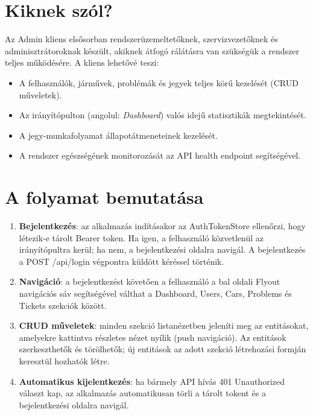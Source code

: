 \documentclass[colorlinks]{thesis-kando}
\begin{document}
\section{Kiknek szól?}

Az Admin kliens elsősorban rendszerüzemeltetőknek, szervizvezetőknek és adminisztrátoroknak készült, akiknek átfogó rálátásra van szükségük a rendszer teljes működésére. A kliens lehetővé teszi:

\begin{itemize}
\item A felhasználók, járművek, problémák és jegyek teljes körű kezelését (CRUD műveletek).
\item Az irányítópulton (angolul: \emph{Dashboard}) valós idejű statisztikák megtekintését.
\item A jegy-munkafolyamat állapotátmeneteinek kezelését.
\item A rendszer egészségének monitorozását az API health endpoint segítségével.
\end{itemize}

\section{A folyamat bemutatása}

\begin{enumerate}
\item \textbf{Bejelentkezés}: az alkalmazás indításakor az AuthTokenStore ellenőrzi, hogy létezik-e tárolt Bearer token. Ha igen, a felhasználó közvetlenül az irányítópultra kerül; ha nem, a bejelentkezési oldalra navigál. A bejelentkezés a POST /api/login végpontra küldött kéréssel történik.
\item \textbf{Navigáció}: a bejelentkezést követően a felhasználó a bal oldali Flyout navigációs sáv segítségével válthat a Dashboard, Users, Cars, Problems és Tickets szekciók között.
\item \textbf{CRUD műveletek}: minden szekció listanézetben jeleníti meg az entitásokat, amelyekre kattintva részletes nézet nyílik (push navigáció). Az entitások szerkeszthetők és törölhetők; új entitások az adott szekció létrehozási formján keresztül hozhatók létre.
\item \textbf{Automatikus kijelentkezés}: ha bármely API hívás 401 Unauthorized választ kap, az alkalmazás automatikusan törli a tárolt tokent és a bejelentkezési oldalra navigál.
\end{enumerate}

\end{document}
